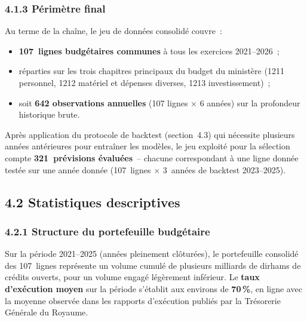\subsubsection*{4.1.3 \quad P\'erim\`etre final}

Au terme de la cha\^ine, le jeu de donn\'ees consolid\'e couvre~:

\begin{itemize}
    \item \textbf{107~lignes budg\'etaires communes} \`a tous les exercices 2021--2026~;
    \item r\'eparties sur les trois chapitres principaux du budget du minist\`ere
    (1211 personnel, 1212 mat\'eriel et d\'epenses diverses, 1213
    investissement)~;
    \item soit \textbf{642 observations annuelles} (107 lignes $\times$ 6
    ann\'ees) sur la profondeur historique brute.
\end{itemize}

Apr\`es application du protocole de backtest (section~4.3) qui n\'ecessite
plusieurs ann\'ees ant\'erieures pour entra\^iner les mod\`eles, le jeu
exploit\'e pour la s\'election compte \textbf{321~pr\'evisions \'evalu\'ees}~--
chacune correspondant \`a une ligne donn\'ee test\'ee sur une ann\'ee
donn\'ee (107~lignes $\times$ 3~ann\'ees de backtest 2023--2025).

\subsection*{4.2 \quad Statistiques descriptives}

\subsubsection*{4.2.1 \quad Structure du portefeuille budg\'etaire}

Sur la p\'eriode 2021--2025 (ann\'ees pleinement cl\^otur\'ees), le
portefeuille consolid\'e des 107~lignes repr\'esente un volume cumul\'e
de plusieurs milliards de dirhams de cr\'edits ouverts, pour un volume
engag\'e l\'eg\`erement inf\'erieur. Le \textbf{taux d'ex\'ecution moyen}
sur la p\'eriode s'\'etablit aux environs de \textbf{70\,\%}, en ligne
avec la moyenne observ\'ee dans les rapports d'ex\'ecution publi\'es par
la Tr\'esorerie G\'en\'erale du Royaume.

